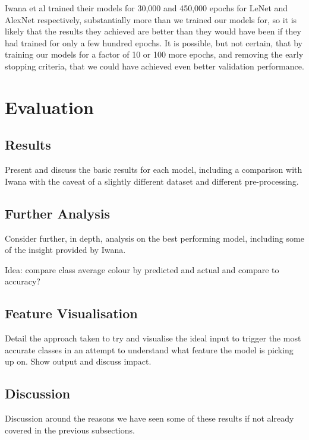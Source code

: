 \documentclass[12pt]{article}
\numberwithin{equation}{section}
\numberwithin{figure}{section}
\begin{document}
Iwana et al trained their models for 30,000 and 450,000 epochs for LeNet and AlexNet respectively, substantially more than we trained our models for, so it is likely that the results they achieved are better than they would have been if they had trained for only a few hundred epochs. It is possible, but not certain, that by training our models for a factor of 10 or 100 more epochs, and removing the early stopping criteria, that we could have achieved even better validation performance.


\section{Evaluation} 
\label{sec:Evaluation_and_Further_Exploration} 
\subsection{Results} 
\label{sub:Results} 
Present and discuss the basic results for each model, including a comparison with Iwana with the caveat of a slightly different dataset and different pre-processing. 

\subsection{Further Analysis} 
\label{sub:Further_Analysis} 
Consider further, in depth, analysis on the best performing model, including some of the insight provided by Iwana.

Idea: compare class average colour by predicted and actual and compare to accuracy?
\subsection{Feature Visualisation} 
\label{sub:Feature_Visualisation} 
Detail the approach taken to try and visualise the ideal input to trigger the most accurate classes in an attempt to understand what feature the model is picking up on. Show output and discuss impact.

\subsection{Discussion} 
\label{sub:Discussion} 
Discussion around the reasons we have seen some of these results if not already covered in the previous subsections. 
\end{document}
